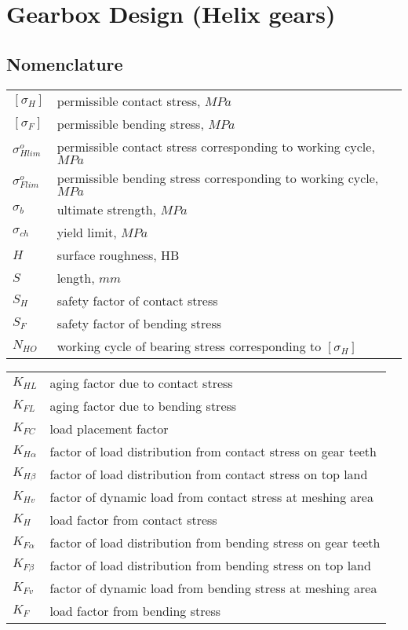 \chapter{Gearbox Design (Helix gears)}
\section{Nomenclature}
	\begin{tabular}[t]{lp{7cm}}
		$ [\sigma_H] $ & permissible contact stress, $ MPa $\\
		$ [\sigma_F] $ & permissible bending stress, $ MPa $\\
		$ \sigma_{Hlim}^o $ & permissible contact stress corresponding to working cycle, $ MPa $\\
		$ \sigma_{Flim}^o $ & permissible bending stress corresponding to working cycle, $ MPa $\\
		$ \sigma_b $ & ultimate strength, $ MPa $\\
		$ \sigma_{ch} $ & yield limit, $ MPa $\\
		$ H $ & surface roughness, $ \text{HB} $\\
		$ S $ & length, $ mm $\\
		$ S_H $ & safety factor of contact stress\\
		$ S_F $ & safety factor of bending stress\\
		$ N_{HO} $ & working cycle of bearing stress corresponding to $ [\sigma_H] $\\
	\end{tabular}
	\begin{tabular}[t]{lp{7cm}}
		$ K_{HL} $ & aging factor due to contact stress\\
		$ K_{FL} $ & aging factor due to bending stress\\
		$ K_{FC} $ & load placement factor\\
		$ K_{H\alpha} $ & factor of load distribution from contact stress on gear teeth\\
		$ K_{H\beta} $ & factor of load distribution from contact stress on top land\\
		$ K_{Hv} $ & factor of dynamic load from contact stress at meshing area\\
		$ K_H $ & load factor from contact stress\\
		$ K_{F\alpha} $ & factor of load distribution from bending stress on gear teeth\\
		$ K_{F\beta} $ & factor of load distribution from bending stress on top land\\
		$ K_{Fv} $ & factor of dynamic load from bending stress at meshing area\\
		$ K_F $ & load factor from bending stress\\
	\end{tabular}\newpage
